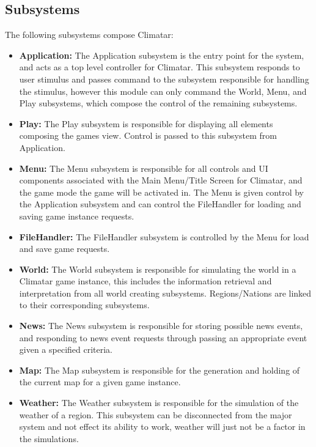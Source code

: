 \documentclass[]{article}
\begin{document}
\subsection{Subsystems}
\label{sub:subsystems}
The following subsystems compose Climatar:
\begin{itemize}
	\item \textbf{Application:} The Application subsystem is the entry point for the system, and acts as a top level controller for Climatar. This subsystem responds to user stimulus and passes command to the subsystem responsible for handling the stimulus, however this module can only command the World, Menu, and Play subsystems, which compose the control of the remaining subsystems.

	\item \textbf{Play:} The Play subsystem is responsible for displaying all elements composing the games view. Control is passed to this subsystem from Application.

	\item \textbf{Menu:} The Menu subsystem is responsible for all controls and UI components associated with the Main Menu/Title Screen for Climatar, and the game mode the game will be activated in. The Menu is given control by the Application subsystem and can control the FileHandler for loading and saving game instance requests.

	\item \textbf{FileHandler:} The FileHandler subsystem is controlled by the Menu for load and save game requests.

	\item \textbf{World:} The World subsystem is responsible for simulating the world in a Climatar game instance, this includes the information retrieval and interpretation from all world creating subsystems. Regions/Nations are linked to their corresponding subsystems.

	\item \textbf{News:} The News subsystem is responsible for storing possible news events, and responding to news event requests through passing an appropriate event given a specified criteria.

	\item \textbf{Map:} The Map subsystem is responsible for the generation and holding of the current map for a given game instance.

	\item \textbf{Weather:} The Weather subsystem is responsible for the simulation of the weather of a region. This subsystem can be disconnected from the major system and not effect its ability to work, weather will just not be a factor in the simulations.


\end{itemize}
\end{document}
